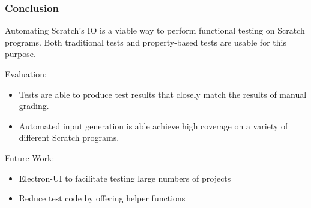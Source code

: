 \begin{frame}
\end{frame}

\begin{frame}\frametitle{Conclusion}
    Automating Scratch's IO is a viable way to perform functional testing on Scratch programs.
    Both traditional tests and property-based tests are usable for this purpose.

    \pause
    \bigskip

    Evaluation:
    \begin{itemize}
        \item Tests are able to produce test results that closely match the results of manual grading.
        \item Automated input generation is able achieve high coverage on a variety of different Scratch programs.
    \end{itemize}

%
%

    \pause
    \bigskip

    Future Work:
    \begin{itemize}
        \item Electron-UI to facilitate testing large numbers of projects
        \item Reduce test code by offering helper functions
    \end{itemize}
\end{frame}

